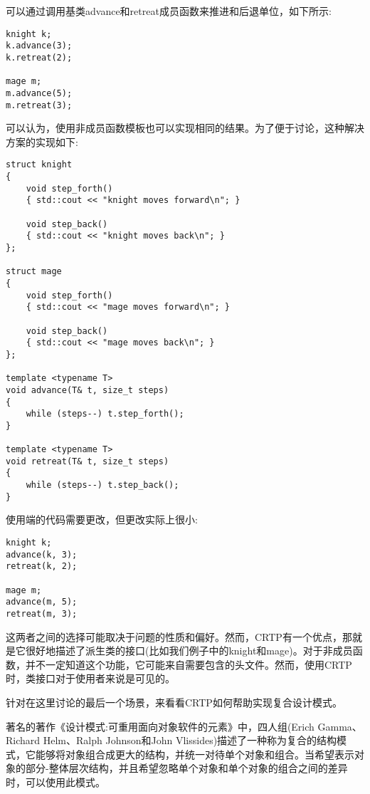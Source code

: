 可以通过调用基类advance和retreat成员函数来推进和后退单位，如下所示:

\begin{lstlisting}[style=styleCXX]
knight k;
k.advance(3);
k.retreat(2);

mage m;
m.advance(5);
m.retreat(3);
\end{lstlisting}

可以认为，使用非成员函数模板也可以实现相同的结果。为了便于讨论，这种解决方案的实现如下:

\begin{lstlisting}[style=styleCXX]
struct knight
{
	void step_forth()
	{ std::cout << "knight moves forward\n"; }
	
	void step_back()
	{ std::cout << "knight moves back\n"; }
};

struct mage
{
	void step_forth()
	{ std::cout << "mage moves forward\n"; }
	
	void step_back()
	{ std::cout << "mage moves back\n"; }
};

template <typename T>
void advance(T& t, size_t steps)
{
	while (steps--) t.step_forth();
}

template <typename T>
void retreat(T& t, size_t steps)
{
	while (steps--) t.step_back();
}
\end{lstlisting}

使用端的代码需要更改，但更改实际上很小:

\begin{lstlisting}[style=styleCXX]
knight k;
advance(k, 3);
retreat(k, 2);

mage m;
advance(m, 5);
retreat(m, 3);
\end{lstlisting}

这两者之间的选择可能取决于问题的性质和偏好。然而，CRTP有一个优点，那就是它很好地描述了派生类的接口(比如我们例子中的knight和mage)。对于非成员函数，并不一定知道这个功能，它可能来自需要包含的头文件。然而，使用CRTP时，类接口对于使用者来说是可见的。

针对在这里讨论的最后一个场景，来看看CRTP如何帮助实现复合设计模式。


著名的著作《设计模式:可重用面向对象软件的元素》中，四人组(Erich Gamma、Richard Helm、Ralph Johnson和John Vlissides)描述了一种称为复合的结构模式，它能够将对象组合成更大的结构，并统一对待单个对象和组合。当希望表示对象的部分-整体层次结构，并且希望忽略单个对象和单个对象的组合之间的差异时，可以使用此模式。

